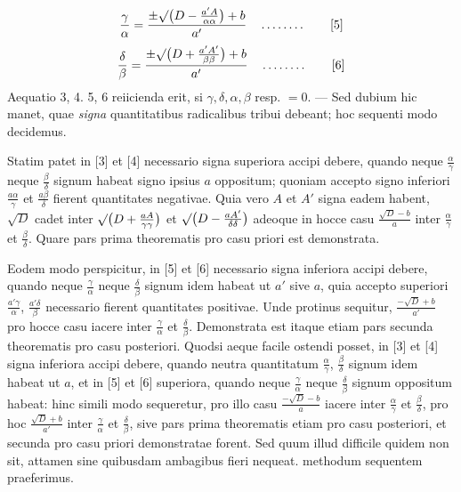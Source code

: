 \begin{equation*}
\frac{\gamma}{\alpha}=\frac{\pm\surd\bigl(D-\frac{a'A}{\alpha\alpha}\bigr)+b}{a'}
\quad \mathinner{\ldotp\ldotp\ldotp\ldotp\ldotp\ldotp\ldotp\ldotp} \tag*{[5]}
\end{equation*}
\begin{equation*}
\frac{\delta}{\beta}=\frac{\pm\surd\bigl(D+\frac{a'A'}{\beta\beta}\bigr)+b}{a'}
\quad \mathinner{\ldotp\ldotp\ldotp\ldotp\ldotp\ldotp\ldotp\ldotp} \tag*{[6]}
\end{equation*}
Aequatio 3, 4. 5, 6 reiicienda erit, si $\gamma,\delta,\alpha,\beta$ resp. $=0$. --- Sed dubium hic manet, quae \textit{signa} quantitatibus radicalibus tribui debeant; hoc sequenti modo decidemus.

Statim patet in [3] et [4] necessario signa superiora accipi debere, quando neque $\frac{\alpha}{\gamma}$ neque $\frac{\beta}{\delta}$ signum habeat signo ipsius $a$ oppositum; quoniam accepto signo inferiori $\frac{a\alpha}{\gamma}$ et $\frac{a\beta}{\delta}$ fierent quantitates negativae. Quia vero $A$ et $A'$ signa eadem habent, $\surd D$ cadet inter $\surd\bigl(D+\frac{aA}{\gamma\gamma}\bigr)$ et $\surd\bigl(D-\frac{aA'}{\delta\delta}\bigr)$ adeoque in hocce casu $\frac{\surd D-b}{a}$ inter $\frac{\alpha}{\gamma}$ et $\frac{\beta}{\delta}$. Quare pars prima theorematis pro casu priori est demonstrata.

Eodem modo perspicitur, in [5] et [6] necessario signa inferiora accipi debere, quando neque $\frac{\gamma}{\alpha}$ neque $\frac{\delta}{\beta}$ signum idem habeat ut $a'$ sive $a$, quia accepto superiori $\frac{a'\gamma}{\alpha}$, $\frac{a'\delta}{\beta}$ necessario fierent quantitates positivae. Unde protinus sequitur, $\frac{-\surd D+b}{a'}$ pro hocce casu iacere inter $\frac{\gamma}{\alpha}$ et $\frac{\delta}{\beta}$. Demonstrata est itaque etiam pars secunda theorematis pro casu posteriori. Quodsi aeque facile ostendi posset, in [3] et [4] signa inferiora accipi debere, quando neutra quantitatum $\frac{\alpha}{\gamma}$, $\frac{\beta}{\delta}$ signum idem habeat ut $a$, et in [5] et [6] superiora, quando neque $\frac{\gamma}{\alpha}$ neque $\frac{\delta}{\beta}$ signum oppositum habeat: hinc simili modo sequeretur, pro illo casu $\frac{-\surd D-b}{a}$ iacere inter $\frac{\alpha}{\gamma}$ et $\frac{\beta}{\delta}$, pro hoc $\frac{\surd D+b}{a'}$ inter $\frac{\gamma}{\alpha}$ et $\frac{\delta}{\beta}$, sive pars prima theorematis etiam pro casu posteriori, et secunda pro casu priori demonstratae forent. Sed quum illud difficile quidem non sit, attamen sine quibusdam ambagibus fieri nequeat. methodum sequentem praeferimus.

